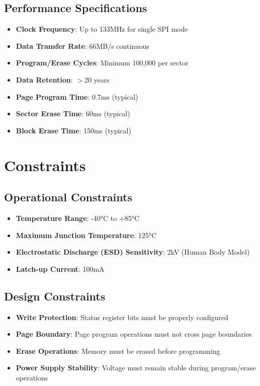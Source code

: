 \subsection{Performance Specifications}
\begin{itemize}
	\item \textbf{Clock Frequency}: Up to 133MHz for single SPI mode
	\item \textbf{Data Transfer Rate}: 66MB/s continuous
	\item \textbf{Program/Erase Cycles}: Minimum 100,000 per sector
	\item \textbf{Data Retention}: $>$20 years \cite{Jotrin:2018}
	\item \textbf{Page Program Time}: 0.7ms (typical)
	\item \textbf{Sector Erase Time}: 60ms (typical)
	\item \textbf{Block Erase Time}: 150ms (typical) \cite{Winbond:2016}
\end{itemize}

\section{Constraints}

\subsection{Operational Constraints}
\begin{itemize}
	\item \textbf{Temperature Range}: -40°C to +85°C \cite{Winbond:2024}
	\item \textbf{Maximum Junction Temperature}: 125°C
	\item \textbf{Electrostatic Discharge (ESD) Sensitivity}: 2kV (Human Body Model)
	\item \textbf{Latch-up Current}: 100mA \cite{Winbond:2016}
\end{itemize}

\subsection{Design Constraints}
\begin{itemize}
	\item \textbf{Write Protection}: Status register bits must be properly configured
	\item \textbf{Page Boundary}: Page program operations must not cross page boundaries
	\item \textbf{Erase Operations}: Memory must be erased before programming
	\item \textbf{Power Supply Stability}: Voltage must remain stable during program/erase operations \cite{Winbond:2016}
\end{itemize}

